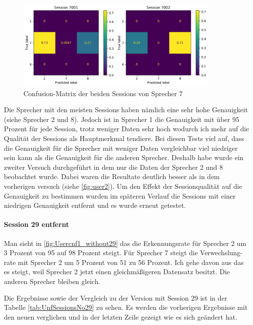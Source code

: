 \begin{figure}[H]
  \centering
  \includegraphics[width=100mm ,scale=0.6]{UserConfMatUser7Unf.png}
  \caption{Confusion-Matrix der beiden Sessions von Sprecher 7}
  \label{fig:cnf3}
\end{figure}

 
Die Sprecher mit den meisten Sessions haben nämlich eine sehr hohe Genauigkeit (siehe Sprecher 2 und 8). Jedoch ist in Sprecher 1 die Genauigkeit mit über 95 Prozent für jede Session, trotz weniger Daten sehr hoch wodurch ich mehr auf die Qualität der Sessions als Hauptmerkmal tendiere.
Bei diesen Tests viel auf, dass die Genauigkeit für die Sprecher mit weniger Daten vergleichbar viel niedriger sein kann  als die Genauigkeit für die anderen Sprecher. Deshalb habe wurde ein zweiter Versuch durchgeführt in dem nur die Daten der Sprecher 2 und 8 beobachtet wurde. Dabei waren die Resultate deutlich besser als in dem vorherigen versuch (siehe  \ref{fig:user2}). Um den Effekt der Sessionqualität auf die Genauigkeit zu bestimmen wurden im späteren Verlauf die Sessions mit einer niedrigen Genauigkeit entfernt und es wurde erneut getestet. 


\paragraph{Session 29 entfernt} 
Man sieht in \ref{fig:Usercnf1_without29} das die Erkennungsrate für Sprecher 2 um 3 Prozent von 95 auf 98 Prozent steigt. Für Sprecher 7 steigt die Verwechslung-rate mit Sprecher 2 um 5 Prozent von 51 zu 56 Prozent. Ich gehe davon aus das es steigt, weil Sprecher 2 jetzt einen gleichmäßigeren Datensatz besitzt. Die anderen Sprecher bleiben gleich.

Die Ergebnisse sowie der Vergleich zu der Version mit Session 29 ist in der Tabelle \ref{tab:UnfSessionsNo29} zu sehen. Es werden die vorherigen Ergebnisse mit den neuen verglichen und in der letzten Zeile gezeigt wie es sich geändert hat.

